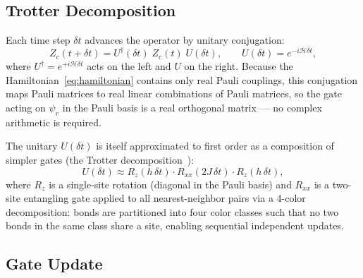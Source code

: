 \documentclass[11pt]{article}
\newcommand{\ham}{\mathcal{H}}
\begin{document}
\subsection{Trotter Decomposition}

Each time step $\delta t$ advances the operator by unitary conjugation:
\begin{equation}
 Z_c(t+\delta t) = U^\dagger(\delta t)\; Z_c(t)\; U(\delta t),
 \qquad U(\delta t) = e^{-i\ham\delta t},
 \label{eq:heisenberg_step}
\end{equation}
where $U^\dagger = e^{+i\ham\delta t}$ acts on the left and $U$ on the right.
Because the Hamiltonian~\eqref{eq:hamiltonian} contains only real Pauli couplings,
this conjugation maps Pauli matrices to real linear combinations of Pauli matrices,
so the gate acting on $\psi_v$ in the Pauli basis is a real orthogonal matrix —
no complex arithmetic is required.

The unitary $U(\delta t)$ is itself approximated to first order as a
composition of simpler gates (the Trotter
decomposition~\citep{suzuki1976generalized}):
\begin{equation}
 U(\delta t) \approx R_z(h\,\delta t) \cdot R_{xx}(2J\,\delta t) \cdot R_z(h\,\delta t),
 \label{eq:trotter}
\end{equation}
where $R_z$ is a single-site rotation (diagonal in the Pauli basis) and $R_{xx}$
is a two-site entangling gate applied to all nearest-neighbor pairs via a
4-color decomposition: bonds are partitioned into four color classes such that no
two bonds in the same class share a site, enabling sequential independent updates.

\subsection{Gate Update}
\label{sec:gate_update}
\end{document}
